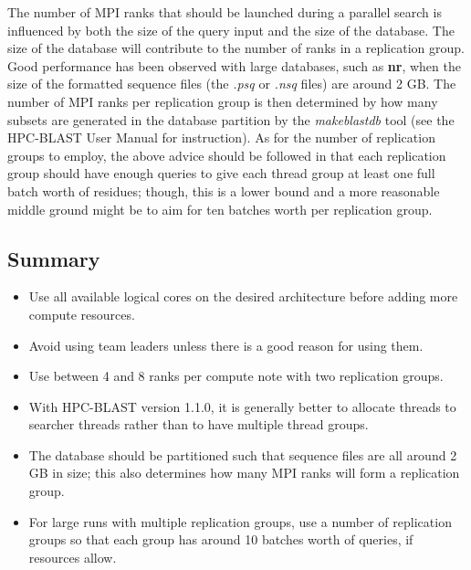 \documentclass[10pt]{article}
\begin{document}
The number of MPI ranks that should be launched during a parallel search is influenced by both the size of the query input and the size of the database.  The size of the database will contribute
to the number of ranks in a replication group.  Good performance has been observed with large databases, such as {\bf nr}, when the size of the formatted sequence files
(the \emph{.psq} or \emph{.nsq} files) are around 2 GB.  The number of MPI ranks per replication group is then determined by how many subsets are generated in the database partition by the
\emph{makeblastdb} tool (see the HPC-BLAST User Manual for instruction).  As for the number of replication groups to employ, the above advice should be followed in that each replication group should
have enough queries to give each thread group at least one full batch worth of residues; though, this is a lower bound and a more reasonable middle ground might be to aim for ten batches worth
per replication group.

\subsection{Summary} \label{ssec:summary}

\begin{itemize}
\item Use all available logical cores on the desired architecture before adding more compute resources.
\item Avoid using team leaders unless there is a good reason for using them.
\item Use between 4 and 8 ranks per compute note with two replication groups.
\item With HPC-BLAST version 1.1.0, it is generally better to allocate threads to searcher threads rather than to have multiple thread groups.
\item The database should be partitioned such that sequence files are all around 2 GB in size; this also determines how many MPI ranks will form a replication group.
\item For large runs with multiple replication groups, use a number of replication groups so that each group has around 10 batches worth of queries, if resources allow.
\end{itemize}
\end{document}

